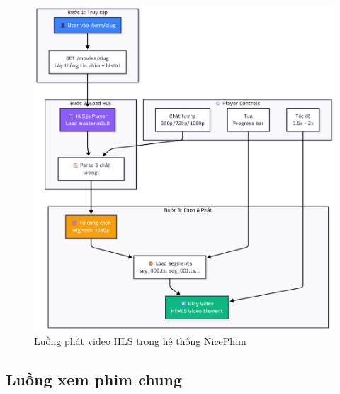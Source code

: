 \begin{figure}[H]
	\centering
	\includegraphics[width=1\textwidth]{image/mermaid/luongphatvideoHLS.png}
	\caption{Luồng phát video HLS trong hệ thống NicePhim}
	\label{fig:luongphatvideoHLS}
\end{figure}

\subsection{Luồng xem phim chung}

